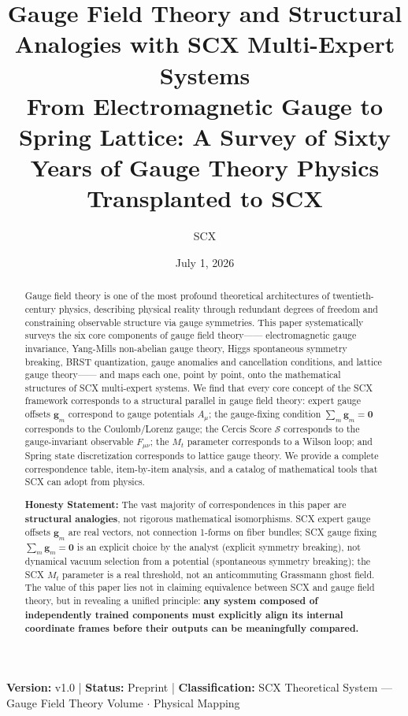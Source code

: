 \documentclass[12pt,a4paper]{article}
\title{\textbf{Gauge Field Theory and Structural Analogies with SCX Multi-Expert Systems}\\[6pt]
\large From Electromagnetic Gauge to Spring Lattice: A Survey of Sixty Years of Gauge Theory Physics Transplanted to SCX}
\author{SCX}
\date{July 1, 2026}
\theoremstyle{remark}
\newcommand{\CercisScore}{\mathcal{S}}
\newcommand{\gaugeparam}{\mathbf{g}}
\begin{document}
\maketitle

\begin{center}
\footnotesize
\textbf{Version:} v1.0 \quad | \quad
\textbf{Status:} Preprint \quad | \quad
\textbf{Classification:} SCX Theoretical System — Gauge Field Theory Volume $\cdot$ Physical Mapping
\end{center}

\begin{abstract}

\noindent
Gauge field theory is one of the most profound theoretical architectures of twentieth-century physics,
describing physical reality through redundant degrees of freedom and constraining observable structure
via gauge symmetries. This paper systematically surveys the six core components of gauge field theory——
electromagnetic gauge invariance, Yang-Mills non-abelian gauge theory, Higgs spontaneous symmetry
breaking, BRST quantization, gauge anomalies and cancellation conditions, and lattice gauge theory——
and maps each one, point by point, onto the mathematical structures of SCX multi-expert systems.
We find that every core concept of the SCX framework corresponds to a structural parallel in gauge
field theory: expert gauge offsets $\gaugeparam_m$ correspond to gauge potentials $A_\mu$;
the gauge-fixing condition $\sum_m \gaugeparam_m = \mathbf{0}$ corresponds to the Coulomb/Lorenz gauge;
the Cercis Score $\CercisScore$ corresponds to the gauge-invariant observable $F_{\mu\nu}$;
the $M_t$ parameter corresponds to a Wilson loop; and Spring state discretization corresponds
to lattice gauge theory. We provide a complete correspondence table, item-by-item analysis,
and a catalog of mathematical tools that SCX can adopt from physics.

\vspace{4pt}
\noindent\textbf{Honesty Statement:}
The vast majority of correspondences in this paper are \textbf{structural analogies}, not rigorous
mathematical isomorphisms. SCX expert gauge offsets $\gaugeparam_m$ are real vectors, not
connection 1-forms on fiber bundles; SCX gauge fixing $\sum_m\gaugeparam_m=\mathbf{0}$ is an
explicit choice by the analyst (explicit symmetry breaking), not dynamical vacuum selection
from a potential (spontaneous symmetry breaking); the SCX $M_t$ parameter is a real threshold,
not an anticommuting Grassmann ghost field. The value of this paper lies not in claiming
equivalence between SCX and gauge field theory, but in revealing a unified principle:
\textbf{any system composed of independently trained components must explicitly align its
internal coordinate frames before their outputs can be meaningfully compared.}


\end{abstract}
\end{document}
